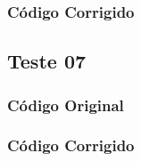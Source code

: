 \subsubsection{Código Corrigido}


\subsection{Teste 07}
\label{subsec:lexicoTeste07}

\subsubsection{Código Original}


\subsubsection{Código Corrigido}
